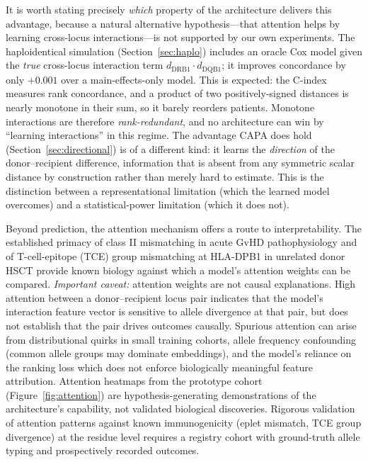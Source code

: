 \documentclass[11pt,a4paper]{article}
\begin{document}
It is worth stating precisely \emph{which} property of the architecture
delivers this advantage, because a natural alternative hypothesis---that
attention helps by learning cross-locus interactions---is not supported by our
own experiments.  The haploidentical simulation (Section~\ref{sec:haplo})
includes an oracle Cox model given the \emph{true} cross-locus interaction term
$d_{\mathrm{DRB1}}\!\cdot\!d_{\mathrm{DQB1}}$; it improves concordance by only
$+0.001$ over a main-effects-only model.  This is expected: the C-index measures
rank concordance, and a product of two positively-signed distances is nearly
monotone in their sum, so it barely reorders patients.  Monotone interactions
are therefore \emph{rank-redundant}, and no architecture can win by ``learning
interactions'' in this regime.  The advantage CAPA does hold
(Section~\ref{sec:directional}) is of a different kind: it learns the
\emph{direction} of the donor--recipient difference, information that is absent
from any symmetric scalar distance by construction rather than merely hard to
estimate.  This is the distinction between a representational limitation (which
the learned model overcomes) and a statistical-power limitation (which it does
not).

Beyond prediction, the attention mechanism offers a route to interpretability.
The established primacy of class II mismatching in acute GvHD
pathophysiology \citep{petersdorf2015hladp, fleischhauer2012hla} and of
T-cell-epitope (TCE) group mismatching at HLA-DPB1 in unrelated donor HSCT
\citep{fleischhauer2012hla} provide known biology against which a model's
attention weights can be compared.  \emph{Important
caveat:} attention weights are not causal explanations.  High attention between
a donor--recipient locus pair indicates that the model's interaction feature
vector is sensitive to allele divergence at that pair, but does not establish
that the pair drives outcomes causally.  Spurious attention can arise from
distributional quirks in small training cohorts, allele frequency confounding
(common allele groups may dominate embeddings), and the model's reliance on
the ranking loss which does not enforce biologically meaningful feature
attribution.  Attention heatmaps from the prototype cohort (Figure~\ref{fig:attention})
are hypothesis-generating demonstrations of the architecture's capability, not
validated biological discoveries.  Rigorous validation of attention patterns
against known immunogenicity (eplet mismatch, TCE group divergence) at the
residue level requires a registry cohort with ground-truth allele typing and
prospectively recorded outcomes.
\end{document}
